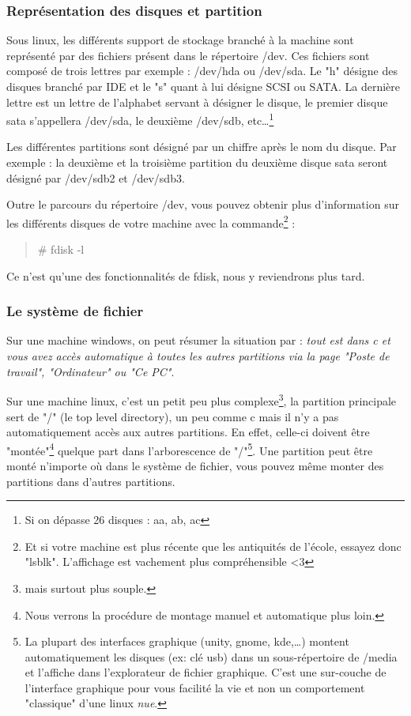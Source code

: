 \documentclass[a4paper]{article}
\newcommand{\commande}[1] {
    \begin{quote}
    \tt\raggedright #1 
    \end{quote}
}
\begin{document}
\subsubsection{Représentation des disques et partition}
\par Sous linux, les différents support de stockage branché à la machine sont représenté par des fichiers présent dans le répertoire /dev. Ces fichiers sont composé de trois lettres par exemple : /dev/hda ou /dev/sda. Le "h" désigne des disques branché par IDE et le "s" quant à lui désigne SCSI ou SATA. La dernière lettre est un lettre de l'alphabet servant à désigner le disque, le premier disque sata s'appellera /dev/sda, le deuxième /dev/sdb, etc\dots\footnote{Si on dépasse 26 disques : aa, ab, ac}
\par Les différentes partitions sont désigné par un chiffre après le nom du disque. Par exemple : la deuxième et la troisième partition du deuxième disque sata seront désigné par /dev/sdb2 et /dev/sdb3.
\par Outre le parcours du répertoire /dev, vous pouvez obtenir plus d'information sur les différents disques de votre machine avec la commande\footnote{Et si votre machine est plus récente que les antiquités de l'école, essayez donc "lsblk". L'affichage est vachement plus compréhensible <3} :
\commande{\# fdisk -l}
\par Ce n'est qu'une des fonctionnalités de fdisk, nous y reviendrons plus tard.
 
\subsubsection{Le système de fichier}
\par Sur une machine windows, on peut résumer la situation par : \emph{tout est dans c et vous avez accès automatique à toutes les autres partitions via la page "Poste de travail", "Ordinateur" ou "Ce PC"}.
\par Sur une machine linux, c'est un petit peu plus complexe\footnote{mais surtout plus souple.}, la partition principale sert de "/" (le top level directory), un peu comme c mais il n'y a pas automatiquement accès aux autres partitions. En effet, celle-ci doivent être "montée"\footnote{Nous verrons la procédure de montage manuel et automatique plus loin.} quelque part dans l'arborescence de "/"\footnote{La plupart des interfaces graphique (unity, gnome, kde,\dots) montent automatiquement les disques (ex: clé usb) dans un sous-répertoire de /media et l'affiche dans l'explorateur de fichier graphique. C'est une sur-couche de l'interface graphique pour vous facilité la vie et non un comportement "classique" d'une linux \emph{nue}.}. Une partition peut être monté n'importe où dans le système de fichier, vous pouvez même monter des partitions dans d'autres partitions.
\end{document}
